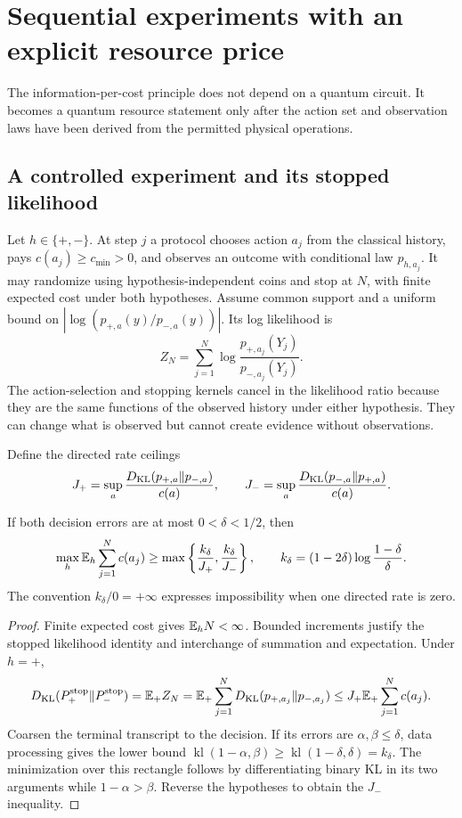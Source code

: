 \section{Sequential experiments with an explicit resource price}
\label{sec:general-sequential}
The information-per-cost principle does not depend on a quantum circuit.
It becomes a quantum resource statement only after the action set and
observation laws have been derived from the permitted physical operations.

\subsection{A controlled experiment and its stopped likelihood}
Let $h\in\{+,-\}$. At step $j$ a protocol chooses action $a_j$ from
the classical history, pays $c(a_j)\geq c_{\min}>0$, and observes an
outcome with conditional law $p_{h,a_j}$. It may randomize using
hypothesis-independent coins and stop at $N$, with finite expected
cost under both hypotheses. Assume common support and a uniform bound
on $|\log(p_{+,a}(y)/p_{-,a}(y))|$.
Its log likelihood is
\begin{equation}\label{eq:general-loglikelihood}
 Z_N=\sum_{j=1}^N\log\frac{p_{+,a_j}(Y_j)}{p_{-,a_j}(Y_j)}.
\end{equation}
The action-selection and stopping kernels cancel in the likelihood
ratio because they are the same functions of the observed history
under either hypothesis. They can change what is observed but cannot
create evidence without observations.

Define the directed rate ceilings
\[
 J_+=\sup_a\frac{D_{\rm KL}(p_{+,a}\|p_{-,a})}{c(a)},\qquad
 J_-=\sup_a\frac{D_{\rm KL}(p_{-,a}\|p_{+,a})}{c(a)}.
\]
\begin{theorem}\label{thm:general-converse}
If both decision errors are at most $0<\delta<1/2$, then
\begin{equation}\label{eq:general-cost-converse}
 \max_h\mathbb E_h\sum_{j=1}^N c(a_j)
 \geq\max\left\{\frac{k_\delta}{J_+},
                \frac{k_\delta}{J_-}\right\},\qquad
 k_\delta=(1-2\delta)\log\frac{1-\delta}{\delta}.
\end{equation}
The convention $k_\delta/0=+\infty$ expresses impossibility when one
directed rate is zero.
\end{theorem}
\begin{proof}
Finite expected cost gives $\mathbb E_hN<\infty$. Bounded increments justify
the stopped likelihood identity and interchange of summation and
expectation. Under $h=+$,
\[
 D_{\rm KL}(P_+^{\rm stop}\|P_-^{\rm stop})
 =\mathbb E_+Z_N
 =\mathbb E_+\sum_{j=1}^N
      D_{\rm KL}(p_{+,a_j}\|p_{-,a_j})
 \leq J_+\mathbb E_+\sum_{j=1}^Nc(a_j).
\]
Coarsen the terminal transcript to the decision. If its errors are
$\alpha,\beta\leq\delta$, data processing gives the lower bound
$\operatorname{kl}(1-\alpha,\beta)\geq
\operatorname{kl}(1-\delta,\delta)=k_\delta$.
The minimization over this rectangle follows by differentiating binary
KL in its two arguments while $1-\alpha>\beta$.
Reverse the hypotheses to obtain the $J_-$ inequality.
\end{proof}

